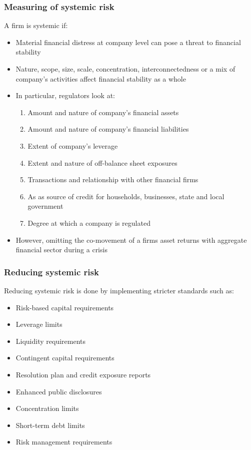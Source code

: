 \documentclass[11pt]{beamer}
\begin{document}
\begin{frame}
\frametitle{Measuring of systemic risk}
A firm is systemic if:
\begin{itemize}
\item Material financial distress at company level can pose a threat to financial stability
\item Nature, scope, size, scale, concentration, interconnectedness or a mix of company's activities affect financial stability as a whole
\item In particular, regulators look at:
\begin{enumerate}
\item Amount and nature of company's financial assets
\item Amount and nature of company's financial liabilities
\item Extent of company's leverage
\item Extent and nature of off-balance sheet exposures
\item Transactions and relationship with other financial firms
\item As as source of credit for households, businesses, state and local government
\item Degree at which a company is regulated
\end{enumerate}
\item However, omitting the co-movement of a firms asset returns with aggregate financial sector during a crisis
\end{itemize}
\end{frame}


\begin{frame}
\frametitle{Reducing systemic risk}
Reducing systemic risk is done by implementing stricter standards such as:
\begin{itemize}
\item Risk-based capital requirements
\item Leverage limits
\item Liquidity requirements
\item Contingent capital requirements
\item Resolution plan and credit exposure reports
\item Enhanced public disclosures
\item Concentration limits
\item Short-term debt limits
\item Risk management requirements
\end{itemize}
\end{frame}
\end{document}
